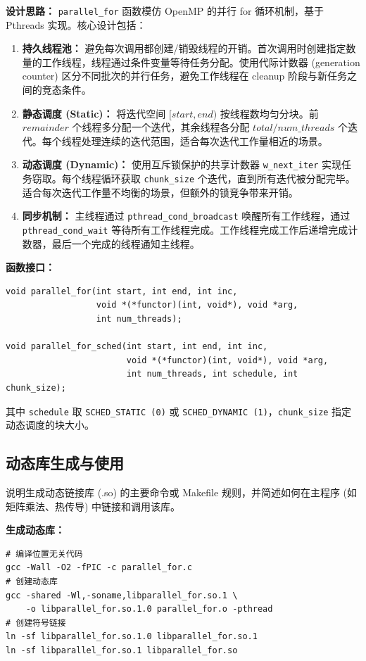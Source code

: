 \documentclass{SYSUReport}
\begin{document}
\textbf{设计思路：}
\texttt{parallel\_for} 函数模仿 OpenMP 的并行 for 循环机制，基于 Pthreads 实现。核心设计包括：

\begin{enumerate}
    \item \textbf{持久线程池：} 避免每次调用都创建/销毁线程的开销。首次调用时创建指定数量的工作线程，线程通过条件变量等待任务分配。使用代际计数器 (generation counter) 区分不同批次的并行任务，避免工作线程在 cleanup 阶段与新任务之间的竞态条件。
    \item \textbf{静态调度 (Static)：} 将迭代空间 $[start, end)$ 按线程数均匀分块。前 $remainder$ 个线程多分配一个迭代，其余线程各分配 $total/num\_threads$ 个迭代。每个线程处理连续的迭代范围，适合每次迭代工作量相近的场景。
    \item \textbf{动态调度 (Dynamic)：} 使用互斥锁保护的共享计数器 \texttt{w\_next\_iter} 实现任务窃取。每个线程循环获取 \texttt{chunk\_size} 个迭代，直到所有迭代被分配完毕。适合每次迭代工作量不均衡的场景，但额外的锁竞争带来开销。
    \item \textbf{同步机制：} 主线程通过 \texttt{pthread\_cond\_broadcast} 唤醒所有工作线程，通过 \texttt{pthread\_cond\_wait} 等待所有工作线程完成。工作线程完成工作后递增完成计数器，最后一个完成的线程通知主线程。
\end{enumerate}

\textbf{函数接口：}
\begin{verbatim}
void parallel_for(int start, int end, int inc,
                  void *(*functor)(int, void*), void *arg,
                  int num_threads);

void parallel_for_sched(int start, int end, int inc,
                        void *(*functor)(int, void*), void *arg,
                        int num_threads, int schedule, int chunk_size);
\end{verbatim}

其中 \texttt{schedule} 取 \texttt{SCHED\_STATIC (0)} 或 \texttt{SCHED\_DYNAMIC (1)}，\texttt{chunk\_size} 指定动态调度的块大小。

\subsection{动态库生成与使用}
说明生成动态链接库 (.so) 的主要命令或 Makefile 规则，并简述如何在主程序 (如矩阵乘法、热传导) 中链接和调用该库。

\textbf{生成动态库：}
\begin{verbatim}
# 编译位置无关代码
gcc -Wall -O2 -fPIC -c parallel_for.c
# 创建动态库
gcc -shared -Wl,-soname,libparallel_for.so.1 \
    -o libparallel_for.so.1.0 parallel_for.o -pthread
# 创建符号链接
ln -sf libparallel_for.so.1.0 libparallel_for.so.1
ln -sf libparallel_for.so.1 libparallel_for.so
\end{verbatim}
\end{document}
